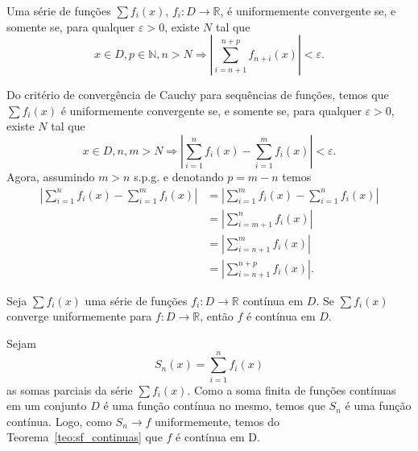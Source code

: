 \begin{teo}\label{teo_criterio_de_Cauchy_serf}
  Uma série de funções $\sum f_i(x)$, $f_i:D\to\mathbb{R}$, é uniformemente convergente se, e somente se, para qualquer $\varepsilon>0$, existe $N$ tal que
  \begin{equation}
    x\in D, p\in\mathbb{N}, n>N \Rightarrow \left|\sum_{i=n+1}^{n+p} f_{n+i}(x)\right| < \varepsilon.
  \end{equation}
\end{teo}
\begin{dem}
  Do critério de convergência de Cauchy para sequências de funções, temos que $\sum f_i(x)$ é uniformemente convergente se, e somente se, para qualquer $\varepsilon>0$, existe $N$ tal que
  \begin{equation}
    x\in D, n,m>N \Rightarrow \left|\sum_{i=1}^n f_i(x) - \sum_{i=1}^m f_i(x)\right| < \varepsilon.
  \end{equation}
Agora, assumindo $m>n$ s.p.g. e denotando $p=m-n$ temos
\begin{align}
  \left|\sum_{i=1}^n f_i(x) - \sum_{i=1}^m f_i(x)\right| &= \left|\sum_{i=1}^m f_i(x) - \sum_{i=1}^n f_i(x)\right|\\
                                                         &= \left|\sum_{i=m+1}^n f_i(x)\right| \\
                                                         &= \left|\sum_{i=n+1}^m f_i(x)\right|\\
                                                         &= \left|\sum_{i=n+1}^{n+p} f_i(x)\right|.
    \end{align}
\end{dem}

\begin{teo}
  Seja $\sum f_i(x)$ uma série de funções $f_i:D\to\mathbb{R}$ contínua em $D$. Se $\sum f_i(x)$ converge uniformemente para $f:D\to\mathbb{R}$, então $f$ é contínua em $D$.
\end{teo}
\begin{dem}
  Sejam
  \begin{equation}
    S_n(x) = \sum_{i=1}^n f_i(x)
  \end{equation}
as somas parciais da série $\sum f_i(x)$. Como a soma finita de funções contínuas em um conjunto $D$ é uma função contínua no mesmo, temos que $S_n$ é uma função contínua. Logo, como $S_n\to f$ uniformemente, temos do Teorema~\ref{teo:sf_continuas} que $f$ é contínua em D.
\end{dem}

